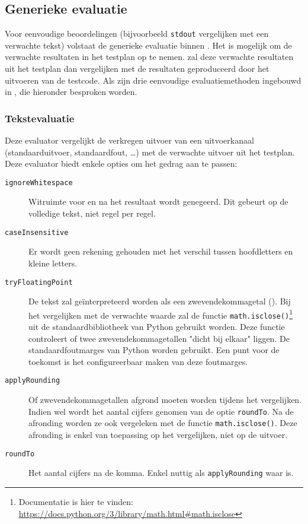 \subsection{Generieke evaluatie}\label{subsec:ingebouwde-evaluator}

Voor eenvoudige beoordelingen (bijvoorbeeld \texttt{stdout} vergelijken met een verwachte tekst) volstaat de generieke evaluatie binnen \tested{}.
Het is mogelijk om de verwachte resultaten in het testplan op te nemen.
\tested{} zal deze verwachte resultaten uit het testplan dan vergelijken met de resultaten geproduceerd door het uitvoeren van de testcode.
Als  zijn drie eenvoudige evaluatiemethoden ingebouwd in \tested{}, die hieronder besproken worden.

\subsubsection{Tekstevaluatie}

Deze evaluator vergelijkt de verkregen uitvoer van een uitvoerkanaal (standaarduitvoer, standaardfout, \ldots) met de verwachte uitvoer uit het testplan.
Deze evaluator biedt enkele opties om het gedrag aan te passen:

\begin{description}
    \item[\texttt{ignoreWhitespace}]
    Witruimte voor en na het resultaat wordt genegeerd.
    Dit gebeurt op de volledige tekst, niet regel per regel.
    \item[\texttt{caseInsensitive}] Er wordt geen rekening gehouden met het verschil tussen hoofdletters en kleine letters.
    \item[\texttt{tryFloatingPoint}]
    De tekst zal geïnterpreteerd worden als een zwevendekommagetal ().
    Bij het vergelijken met de verwachte waarde zal de functie \texttt{math.isclose()}\footnote{Documentatie is hier te vinden: \url{https://docs.python.org/3/library/math.html\#math.isclose}} uit de standaardbibliotheek van Python gebruikt worden.
    Deze functie controleert of twee zwevendekommagetallen "dicht bij elkaar" liggen.
    De standaardfoutmarges van Python worden gebruikt.
    Een punt voor de toekomst is het configureerbaar maken van deze foutmarges.
    \item[\texttt{applyRounding}] Of zwevendekommagetallen afgrond moeten worden tijdens het vergelijken.
    Indien wel wordt het aantal cijfers genomen van de optie \texttt{roundTo}.
    Na de afronding worden ze ook vergeleken met de functie \texttt{math.isclose()}.
    Deze afronding is enkel van toepassing op het vergelijken, niet op de uitvoer.
    \item[\texttt{roundTo}] Het aantal cijfers na de komma.
    Enkel nuttig als \texttt{applyRounding} waar is.
\end{description}

